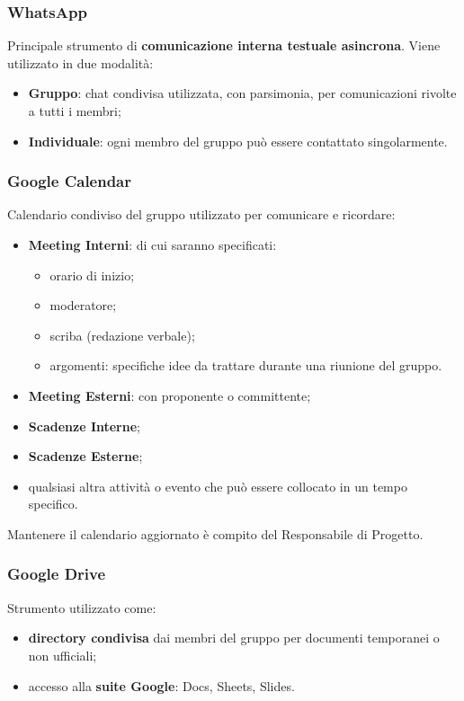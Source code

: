 \subsubsection{WhatsApp}
Principale strumento di \textbf{comunicazione interna testuale asincrona}. Viene utilizzato in due modalità:
\begin{itemize}
  \item \textbf{Gruppo}: chat condivisa utilizzata, con parsimonia, per comunicazioni rivolte a tutti i membri;
  \item \textbf{Individuale}: ogni membro del gruppo può essere contattato singolarmente.
\end{itemize}

\subsubsection{Google Calendar}
Calendario condiviso del gruppo utilizzato per comunicare e ricordare:
\begin{itemize}
  \item \textbf{Meeting Interni}: di cui saranno specificati:
  \begin{itemize}
    \item orario di inizio;
    \item moderatore;
    \item scriba (redazione verbale);
    \item argomenti: specifiche idee da trattare durante una riunione del gruppo.
  \end{itemize}
  \item \textbf{Meeting Esterni}: con proponente o committente;
  \item \textbf{Scadenze Interne};
  \item \textbf{Scadenze Esterne};
  \item qualsiasi altra attività o evento che può essere collocato in un tempo specifico.
\end{itemize}
Mantenere il calendario aggiornato è compito del Responsabile di Progetto.

\subsubsection{Google Drive}
Strumento utilizzato come:
\begin{itemize}
  \item \textbf{directory condivisa} dai membri del gruppo per documenti temporanei o non ufficiali;
  \item accesso alla \textbf{suite Google}: Docs, Sheets, Slides.
\end{itemize}

